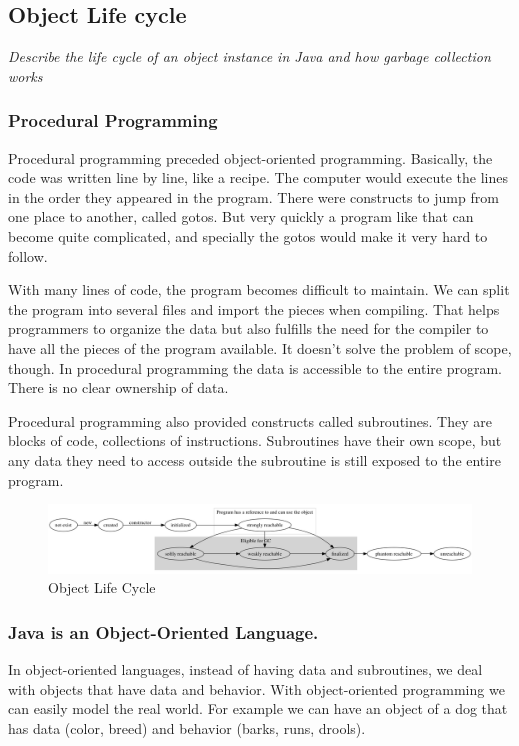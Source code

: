 \subsection{Object Life cycle}
\begin{center}\textit{Describe the life cycle of an object instance in Java and how garbage collection works}\end{center}

\subsubsection{Procedural Programming} 
Procedural programming preceded object-oriented programming. Basically, the code was written line by line, like a recipe. The computer would execute the lines in the order they appeared in the program. There were constructs to jump from one place to another, called gotos. But very quickly a program like that can become quite complicated, and specially the gotos would make it very hard to follow. 

With many lines of code, the program becomes difficult to maintain. We can split the program into several files and import the pieces when compiling. That helps programmers to organize the data but also fulfills the need for the compiler to have all the pieces of the program available. It doesn't solve the problem of scope, though. In procedural programming the data is accessible to the entire program. There is no clear ownership of data.

Procedural programming also provided constructs called subroutines. They are blocks of code, collections of instructions. Subroutines have their own scope, but any data they need to access outside the subroutine is still exposed to the entire program.

\begin{figure}[!htp]\centering %
\includegraphics[width=\textwidth, frame]{object-life-cycle.png}
\caption{Object Life Cycle}
\label{fig:object-life-cycle}
\end{figure}

\subsubsection{Java is an Object-Oriented Language.} In object-oriented languages, instead of having data and subroutines, we deal with objects that have data and behavior. With object-oriented programming we can easily model the real world. For example we can have an object of a dog that has data (color, breed) and behavior (barks, runs, drools). 

